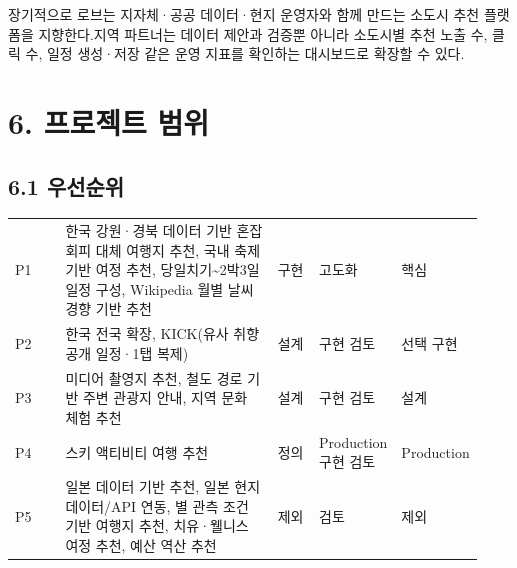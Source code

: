 \documentclass[12pt,a4paper]{article}
\newcommand{\DocNeedspace}[1]{\par\ifdim\dimexpr\pagegoal-\pagetotal\relax<#1\newpage\fi}
\renewcommand{\arraystretch}{1.35}
\begin{document}
\DocNeedspace{3\baselineskip}
장기적으로 로브는 지자체·공공 데이터·현지 운영자와 함께 만드는 소도시 추천 플랫폼을 지향한다.\newline 지역 파트너는 데이터 제안과 검증뿐 아니라 소도시별 추천 노출 수, 클릭 수, 일정 생성·저장 같은 운영 지표를 확인하는 대시보드로 확장할 수 있다.


\newpage

\DocNeedspace{10\baselineskip}
\section*{6. 프로젝트 범위}


\DocNeedspace{8\baselineskip}
\subsection*{6.1 우선순위}


\DocNeedspace{16\baselineskip}
\begin{footnotesize}
\setlength{\tabcolsep}{3pt}
\setlength{\extrarowheight}{1pt}
\renewcommand{\arraystretch}{1.48}
\begin{longtable}{@{}>{\centering\arraybackslash}m{0.114\linewidth}>{\RaggedRight\arraybackslash}m{0.477\linewidth}>{\centering\arraybackslash}m{0.095\linewidth}>{\centering\arraybackslash}m{0.133\linewidth}>{\centering\arraybackslash}m{0.114\linewidth}@{}}
\toprule
\multicolumn{1}{>{\centering\arraybackslash}m{0.114\linewidth}}{\textbf{우선순위}} & \multicolumn{1}{>{\centering\arraybackslash}m{0.477\linewidth}}{\textbf{기능 범위}} & \multicolumn{1}{>{\centering\arraybackslash}m{0.095\linewidth}}{\textbf{PoC}} & \multicolumn{1}{>{\centering\arraybackslash}m{0.133\linewidth}}{\textbf{{\footnotesize Production}}} & \multicolumn{1}{>{\centering\arraybackslash}m{0.114\linewidth}}{\textbf{상태}} \\
\midrule
\endhead
P1 & 한국 강원·경북 데이터 기반 혼잡 회피 대체 여행지 추천, 국내 축제 기반 여정 추천, 당일치기\textasciitilde{}2박3일 일정 구성, Wikipedia 월별 날씨 경향 기반 추천 & 구현 & 고도화 & 핵심 \\
P2 & 한국 전국 확장, KICK(유사 취향 공개 일정·1탭 복제) & 설계 & 구현 검토 & 선택 구현 \\
P3 & 미디어 촬영지 추천, 철도 경로 기반 주변 관광지 안내, 지역 문화 체험 추천 & 설계 & 구현 검토 & 설계 \\
P4 & 스키 액티비티 여행 추천 & 정의 & Production 구현 검토 & {\footnotesize Production} \\
P5 & 일본 데이터 기반 추천, 일본 현지 데이터/API 연동, 별 관측 조건 기반 여행지 추천, 치유·웰니스 여정 추천, 예산 역산 추천 & 제외 & 검토 & 제외 \\
\bottomrule
\end{longtable}
\end{footnotesize}
\end{document}
